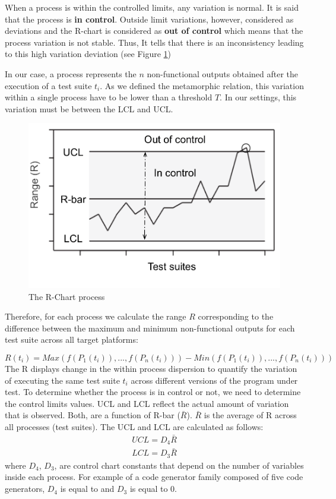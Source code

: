 When a process is within the controlled limits, any variation is normal. It is said that the process is \textbf{in control}. 
Outside limit variations, however, considered as deviations and the R-chart is considered as \textbf{out of control} which means that the process variation is not stable. Thus, It tells that there is an inconsistency leading to this high variation deviation (see Figure \ref{fig:cg-rechart})

In our case, a process represents the $n$ non-functional outputs obtained after the execution of a test suite $t_{i}$. As we defined the metamorphic relation, this variation within a single process have to be lower than a threshold $T$. In our settings, this variation must be between the LCL and UCL.

\begin{figure}[h]
	\centering
	\includegraphics[width=0.6\linewidth]{chapitre4/fig/rchat}
	\caption{The R-Chart process}
	\label{fig:cg-rechart}
\end{figure}

Therefore, for each process we calculate the range $R$ corresponding to the difference between the maximum and minimum non-functional outputs for each test suite across all target platforms:

\begin{equation}
R(t_{i})= Max(f(P_{1}(t_{i})),..., f(P_{n}(t_{i}))) - Min(f(P_{1}(t_{i})),..., f(P_{n}(t_{i})))  
\end{equation}
The R displays change in the within process dispersion to quantify the variation of executing the same test suite $t_{i}$ across different versions of the program under test.
To determine whether the process is in control or not, we need to determine the control limits values. UCL and LCL reflect the actual amount of variation that is observed. Both, are a function of R-bar ($\bar{R}$). $\bar{R}$ is the average of R across all processes (test suites).
The UCL and LCL are calculated as follows:
\begin{equation}
\begin{split} 
UCL = D_{4}\bar{R}\\
LCL = D_{3}\bar{R}
\end{split} 
\end{equation}
where $D_{4}$, $D_{3}$, are control chart constants that depend on the number of variables inside each process. For example of a code generator family composed of five code generators, $D_{4}$ is equal to and $D_{3}$ is equal to 0. 

